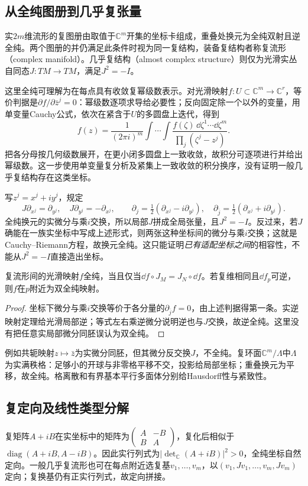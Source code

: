 \subsection{从全纯图册到几乎复张量}
\begin{definition}\label{def:complex-atlas}
实$2m$维流形的复图册由取值于$\mathbb C^m$开集的坐标卡组成，重叠处换元为全纯双射且逆全纯。两个图册的并仍满足此条件时视为同一复结构，装备复结构者称复流形（complex manifold）。几乎复结构（almost complex structure）则仅为光滑实丛自同态$J:TM\to TM$，满足$J^2=-I$。
\end{definition}
这里全纯可理解为在每点具有收敛复幂级数表示。对光滑映射$f:U\subset\mathbb C^m\to\mathbb C^r$，等价判据是$\partial f/\partial\bar z^j=0$：幂级数逐项求导给必要性；反向固定除一个以外的变量，用单变量Cauchy公式，依次在紧含于$U$的多圆盘上迭代，得到
\[
 f(z)=\frac1{(2\pi i)^m}\int\cdots\int
 \frac{f(\zeta)\,\dd\zeta^1\cdots\dd\zeta^m}
 {\prod_j(\zeta^j-z^j)}.
\]
把各分母按几何级数展开，在更小闭多圆盘上一致收敛，故积分可逐项进行并给出幂级数。这一步使用单变量复分析及紧集上一致收敛的积分换序，没有证明一般几乎复结构存在这类坐标。

写$z^j=x^j+iy^j$，规定
\[
 J\partial_{x^j}=\partial_{y^j},\quad
 J\partial_{y^j}=-\partial_{x^j},\qquad
 \partial_j=\tfrac12(\partial_{x^j}-i\partial_{y^j}),\quad
 \partial_{\bar j}=\tfrac12(\partial_{x^j}+i\partial_{y^j}).
\]
全纯换元的实微分与乘$i$交换，所以局部$J$拼成全局张量，且$J^2=-I$。反过来，若$J$确能在一族实坐标中写成上述形式，则两张这种坐标间的微分与乘$i$交换；这就是Cauchy--Riemann方程，故换元全纯。这只能证明\emph{已有适配坐标之间}的相容性，不能从$J^2=-I$直接造出坐标。

\begin{proposition}\label{prop:complex-map-inverse}
复流形间的光滑映射$f$全纯，当且仅当$\dd f\circ J_M=J_N\circ\dd f$。若复维相同且$\dd f_p$可逆，则$f$在$p$附近为双全纯映射。
\end{proposition}
\begin{proof}
坐标下微分与乘$i$交换等价于各分量的$\partial_{\bar j}f=0$，由上述判据得第一条。实逆映射定理给光滑局部逆；等式左右乘逆微分说明逆也与$J$交换，故逆全纯。这里没有把任意实局部微分同胚误认为双全纯。
\end{proof}
例如共轭映射$z\mapsto\bar z$为实微分同胚，但其微分反交换$J$，不全纯。复环面$\mathbb C^m/\Lambda$中$\Lambda$为实满秩格：足够小的开球与非零格平移不交，投影给局部坐标；重叠换元为平移，故全纯。格离散和有界基本平行多面体分别给Hausdorff性与紧致性。

\subsection{复定向及线性类型分解}
复矩阵$A+iB$在实坐标中的矩阵为$\left(\begin{smallmatrix}A&-B\\B&A\end{smallmatrix}\right)$，复化后相似于$\operatorname{diag}(A+iB,A-iB)$。因此实行列式为$|\det_{\mathbb C}(A+iB)|^2>0$，全纯坐标自然定向。一般几乎复流形也可在每点附近选复基$v_1,\ldots,v_m$，以$(v_1,Jv_1,\ldots,v_m,Jv_m)$定向；复换基仍有正实行列式，故定向拼接。

